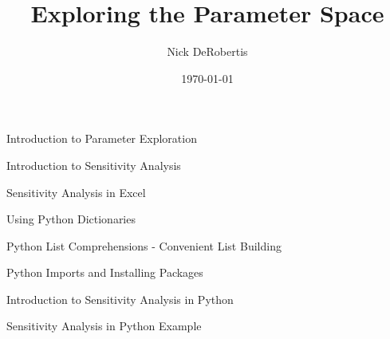 \documentclass[]{article}
\begin{document}
\title{Exploring the Parameter Space}
\author{Nick DeRobertis}
\date{\today}
\maketitle
\begin{section}{Introduction to Parameter Exploration}

\end{section}
\begin{section}{Introduction to Sensitivity Analysis}

\end{section}
\begin{section}{Sensitivity Analysis in Excel}

\end{section}
\begin{section}{Using Python Dictionaries}

\end{section}
\begin{section}{Python List Comprehensions - Convenient List Building}

\end{section}
\begin{section}{Python Imports and Installing Packages}

\end{section}
\begin{section}{Introduction to Sensitivity Analysis in Python}

\end{section}
\begin{section}{Sensitivity Analysis in Python Example}

\end{section}
\end{document}
